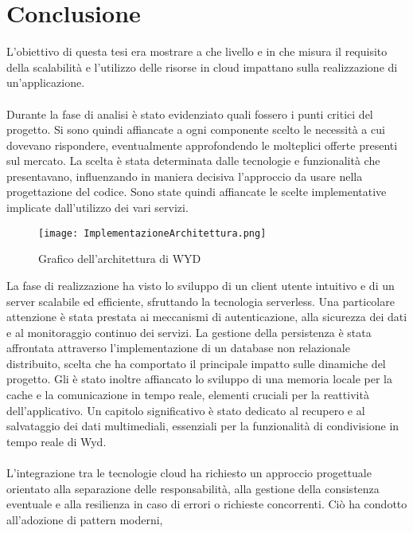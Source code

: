 \clearpage
\chapter*{Conclusione}
L'obiettivo di questa tesi era mostrare a che livello e in che misura
il requisito della scalabilità e l'utilizzo delle risorse in cloud impattano sulla realizzazione di un'applicazione.\\
\\
Durante la fase di analisi è stato evidenziato quali fossero i punti critici del progetto.
Si sono quindi affiancate a ogni componente scelto le necessità a cui dovevano rispondere,
eventualmente approfondendo le molteplici offerte presenti sul mercato.
La scelta è stata determinata dalle tecnologie e funzionalità che presentavano, 
influenzando in maniera decisiva l'approccio da usare
nella progettazione del codice.
Sono state quindi affiancate le scelte implementative implicate dall'utilizzo dei vari servizi.\\
\begin{figure}[htbp]
    \begin{center}
        \texttt{[image: ImplementazioneArchitettura.png]}
        \caption{Grafico dell'architettura di WYD}
    \end{center}
\end{figure}
\clearpage
La fase di realizzazione ha visto lo sviluppo di un client utente intuitivo 
e di un server scalabile ed efficiente, sfruttando la tecnologia serverless.
Una particolare attenzione è stata prestata ai meccanismi di autenticazione, 
alla sicurezza dei dati e al monitoraggio continuo dei servizi.
La gestione della persistenza è stata affrontata 
attraverso l'implementazione di un database non relazionale distribuito,
scelta che ha comportato il principale impatto sulle dinamiche del progetto.
Gli è stato inoltre affiancato lo sviluppo 
di una memoria locale per la cache e la comunicazione in tempo reale, 
elementi cruciali per la reattività dell'applicativo.
Un capitolo significativo è stato dedicato al recupero e al salvataggio dei dati multimediali, 
essenziali per la funzionalità di condivisione in tempo reale di Wyd.\\
\\
L'integrazione tra le tecnologie cloud ha richiesto 
un approccio progettuale orientato alla separazione delle responsabilità, 
alla gestione della consistenza eventuale e alla resilienza in caso di errori o richieste concorrenti. Ciò ha condotto all'adozione di pattern moderni, 
